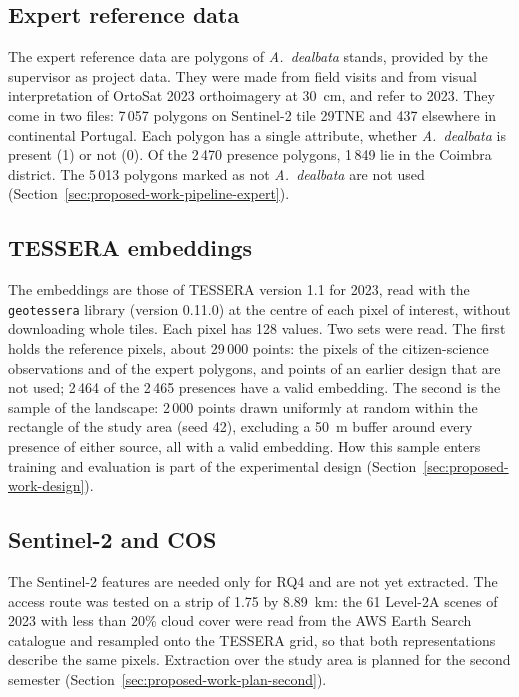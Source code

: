 \subsection{Expert reference data}
\label{sec:proposed-work-data-expert}

The expert reference data are polygons of \emph{A.~dealbata} stands,
provided by the supervisor as project data. They were made from field
visits and from visual interpretation of OrtoSat 2023 orthoimagery at
30~cm, and refer to 2023. They come in two files: 7\,057 polygons on
Sentinel-2 tile 29TNE and 437 elsewhere in continental Portugal. Each
polygon has a single attribute, whether \emph{A.~dealbata} is present
(1) or not (0). Of the 2\,470 presence polygons, 1\,849 lie in the
Coimbra district. The 5\,013 polygons marked as not \emph{A.~dealbata}
are not used (Section~\ref{sec:proposed-work-pipeline-expert}).

\subsection{TESSERA embeddings}
\label{sec:proposed-work-data-tessera}

The embeddings are those of TESSERA version 1.1 for 2023, read with the
\texttt{geotessera} library (version 0.11.0) at the centre of each
pixel of interest, without downloading whole tiles. Each pixel has 128
values. Two sets were read. The first holds the reference pixels,
about 29\,000 points: the pixels of the citizen-science observations
and of the expert polygons, and points of an earlier design that are
not used; 2\,464 of the 2\,465
presences have a valid embedding. The second is the sample of the
landscape: 2\,000 points drawn uniformly at random within the
rectangle of the study area (seed 42), excluding a 50~m buffer around
every presence of either source, all with a valid embedding. How this
sample enters training and evaluation is part of the experimental
design (Section~\ref{sec:proposed-work-design}).

\subsection{Sentinel-2 and COS}
\label{sec:proposed-work-data-sentinel2}

The Sentinel-2 features are needed only for RQ4 and are not yet
extracted. The access route was tested on a strip of 1.75 by 8.89~km:
the 61 Level-2A scenes of 2023 with less than 20\% cloud cover were
read from the AWS Earth Search catalogue and resampled onto the
TESSERA grid, so that both representations describe the same pixels.
Extraction over the study area is planned for the second semester
(Section~\ref{sec:proposed-work-plan-second}).

